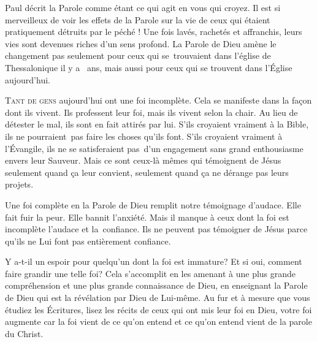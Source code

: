 Paul décrit la Parole comme étant ce qui \Og agit en vous qui croyez. \Fg{}
 Il est si merveilleux de voir les effets de la Parole sur la vie
 de ceux qui étaient pratiquement détruits par le péché !
 Une fois lavés, rachetés et affranchis, leurs vies sont devenues
 riches d'un sens profond. La Parole de Dieu amène le changement
 \ocadr pas seulement pour ceux qui se~trouvaient dans l'église
 de Thessalonique il y a ~ans, mais aussi pour ceux
 qui se trouvent dans l'Église  aujourd'hui.

\dvrule






\lettrine{T}{ant de gens} aujourd'hui ont une foi incomplète.
 Cela se manifeste dans la fa\c{c}on dont ils vivent. Ils professent leur foi,
 mais ils vivent selon la chair. Au lieu de détester le mal,
 ils sont en fait attirés par lui. S'ils croyaient vraiment à la Bible,
 ils ne pourraient~pas faire les choses qu'ils font.
 S'ils croyaient vraiment à l'Évangile, ils ne se satisferaient pas~d'un
 engagement sans grand enthousiasme envers leur Sauveur.
 Mais ce sont ceux-là mêmes qui témoignent de Jésus seulement
 quand \c{c}a leur convient, seulement quand \c{c}a ne dérange pas leurs projets.


Une foi complète en la Parole de Dieu remplit notre témoignage d'audace.
 Elle fait fuir la peur. Elle bannit l'anxiété. Mais il manque à ceux
 dont la foi est incomplète l'audace et la~confiance.
 Ils ne peuvent pas témoigner de Jésus parce qu'ils ne Lui font pas
 entièrement confiance.

Y a-t-il  un espoir pour quelqu'un dont la foi est immature?
 Et si oui, comment faire grandir une telle foi? Cela s'accomplit
 en les amenant à une plus grande compréhension et une plus grande
 connaissance de Dieu, en enseignant la Parole de Dieu qui est la révélation
 par Dieu de Lui-même. Au fur et à mesure que vous étudiez les Écritures,
 lisez les récits de ceux qui ont mis leur foi en Dieu, votre foi augmente
 \ocadr car la foi vient de ce qu'on entend et ce qu'on entend vient
 de la parole du Christ.

